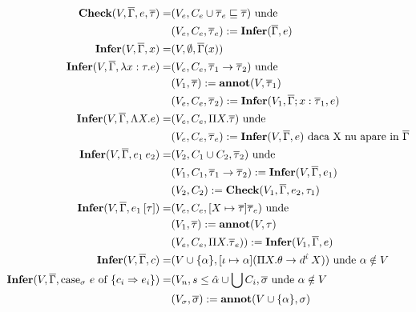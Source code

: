 \done{}
\begin{figure}
\begin{align*}
\textbf{Check} (V,\overline{\Gamma},e,\overline{\tau}) =
    &(V_e, C_e \cup \overline{\tau}_e \sqsubseteq \overline{\tau}) \text{ unde } \\
    &(V_e, C_e, \overline{\tau}_e) := \textbf{Infer}(\overline{\Gamma},e)\\
\textbf{Infer}(V,\overline{\Gamma},x) =
    &(V,\emptyset,\overline{\Gamma}(x))\\
\textbf{Infer} (V,\overline{\Gamma}, \lambda x : \tau.e) =
    &(V_e, C_e, \overline{\tau}_1 \to \overline{\tau}_2) \text{ unde } \\
    &(V_1,\overline{\tau}) := \textbf {annot} ( V, \overline{\tau}_1) \\
    &(V_e,C_e,\overline{\tau}_2):= \textbf{Infer}(V_1, \overline{\Gamma};x: \overline{\tau}_1,e)\\
\textbf{Infer} (V,\overline{\Gamma}, \Lambda X.e) =
    & (V_e, C_e,\Pi X.\overline{\tau}) \text{ unde }\\
    & (V_e, C_e, \overline{\tau}_e) := \textbf{Infer}(V,\overline{\Gamma},e)  \text{ daca X nu apare in } \overline{\Gamma} \\
\textbf{Infer}(V,\overline{\Gamma},e_1\app e_2)   =
    & (V_2, C_1 \cup C_2, \overline{\tau}_2) \text { unde } \\
    & (V_1, C_1, \overline{\tau}_1 \to \overline{\tau}_2) := \textbf{Infer}(V,\overline{\Gamma},e_1) \\
    & (V_2, C_2) :=  \textbf{Check}(V_1,\overline{\Gamma},e_2, \tau_1) \\
\textbf{Infer}(V,\overline{\Gamma},e_1\app [\tau])   =
    & (V_e, C_e, [X \mapsto \overline{\tau}]\overline{\tau}_e) \text { unde }\\
    & (V_1,\overline{\tau}) := \textbf{annot}(V,\tau) \\
    & (V_e, C_e, \Pi X.  \overline{\tau}_e)) := \textbf{Infer}(V_1,\overline{\Gamma},e) \\
\textbf{Infer}(V,\overline{\Gamma},c)   =
    &(V \cup \{\alpha\}, [\iota \mapsto \alpha] (\Pi X. \theta \to d^{\hat{\iota}}\app X)) \text{ unde } \alpha \notin V \\
\textbf{Infer}(V,\overline{\Gamma}, \text{case}_\sigma\ e \text{ of } \{ c_i \Rightarrow e_i\}) =
    & (V_n, s \le \hat{\alpha} \cup \bigcup C_i, \overline{\sigma} \text{ unde } \alpha \notin V \\
    & (V_{\sigma}, \overline{\sigma}) := \textbf{annot}(V\cup \{\alpha\}, \sigma) \\

\end{align*}
\end{figure}
